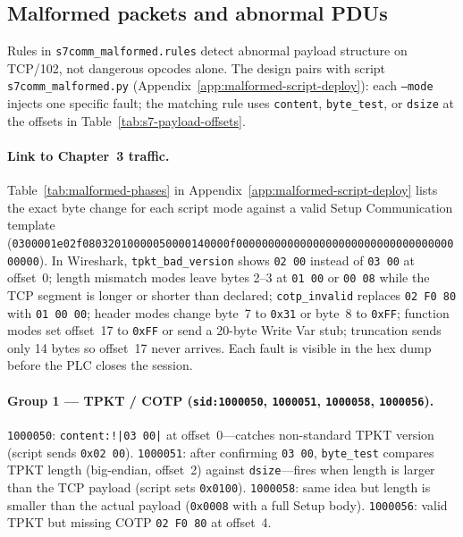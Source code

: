 \subsection{Malformed packets and abnormal PDUs}
\label{sec:rules-malformed}

Rules in \texttt{s7comm\_malformed.rules} detect abnormal payload structure on TCP/102, not dangerous opcodes alone. The design pairs with script \texttt{s7comm\_malformed.py} (Appendix~\ref{app:malformed-script-deploy}): each \texttt{--mode} injects one specific fault; the matching rule uses \texttt{content}, \texttt{byte\_test}, or \texttt{dsize} at the offsets in Table~\ref{tab:s7-payload-offsets}.

\paragraph{Link to Chapter~3 traffic.}
Table~\ref{tab:malformed-phases} in Appendix~\ref{app:malformed-script-deploy} lists the exact byte change for each script mode against a valid Setup Communication template (\texttt{0300001e02f08032010000050000140000f000000000000000000000000000000000000000}). In Wireshark, \texttt{tpkt\_bad\_version} shows \texttt{02 00} instead of \texttt{03 00} at offset~0; length mismatch modes leave bytes 2--3 at \texttt{01 00} or \texttt{00 08} while the TCP segment is longer or shorter than declared; \texttt{cotp\_invalid} replaces \texttt{02 F0 80} with \texttt{01 00 00}; header modes change byte~7 to \texttt{0x31} or byte~8 to \texttt{0xFF}; function modes set offset~17 to \texttt{0xFF} or send a 20-byte Write Var stub; truncation sends only 14 bytes so offset~17 never arrives. Each fault is visible in the hex dump before the PLC closes the session.

\paragraph{Group 1 --- TPKT / COTP (\texttt{sid:1000050}, \texttt{1000051}, \texttt{1000058}, \texttt{1000056}).}

\texttt{1000050}: \texttt{content:!|03 00|} at offset~0---catches non-standard TPKT version (script sends \texttt{0x02 00}). \texttt{1000051}: after confirming \texttt{03 00}, \texttt{byte\_test} compares TPKT length (big-endian, offset~2) against \texttt{dsize}---fires when length is larger than the TCP payload (script sets \texttt{0x0100}). \texttt{1000058}: same idea but length is smaller than the actual payload (\texttt{0x0008} with a full Setup body). \texttt{1000056}: valid TPKT but missing COTP \texttt{02 F0 80} at offset~4.

